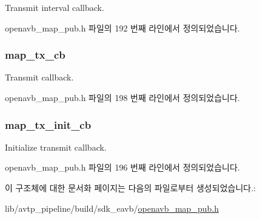 Transmit interval callback. 



openavb\+\_\+map\+\_\+pub.\+h 파일의 192 번째 라인에서 정의되었습니다.

\subsubsection[{\texorpdfstring{map\+\_\+tx\+\_\+cb}{map_tx_cb}}]{ map\+\_\+tx\+\_\+cb}\hypertarget{structopenavb__map__cb__t_a4a157fb8eb778c17724d3121c42bc9c7}{}\label{structopenavb__map__cb__t_a4a157fb8eb778c17724d3121c42bc9c7}


Transmit callback. 



openavb\+\_\+map\+\_\+pub.\+h 파일의 198 번째 라인에서 정의되었습니다.

\subsubsection[{\texorpdfstring{map\+\_\+tx\+\_\+init\+\_\+cb}{map_tx_init_cb}}]{ map\+\_\+tx\+\_\+init\+\_\+cb}\hypertarget{structopenavb__map__cb__t_a187e10e5170f1fc6d1162148f9edf2d9}{}\label{structopenavb__map__cb__t_a187e10e5170f1fc6d1162148f9edf2d9}


Initialize transmit callback. 



openavb\+\_\+map\+\_\+pub.\+h 파일의 196 번째 라인에서 정의되었습니다.



이 구조체에 대한 문서화 페이지는 다음의 파일로부터 생성되었습니다.\+:\begin{DoxyCompactItemize}
\item 
lib/avtp\+\_\+pipeline/build/sdk\+\_\+eavb/\hyperlink{build_2sdk__eavb_2openavb__map__pub_8h}{openavb\+\_\+map\+\_\+pub.\+h}\end{DoxyCompactItemize}
